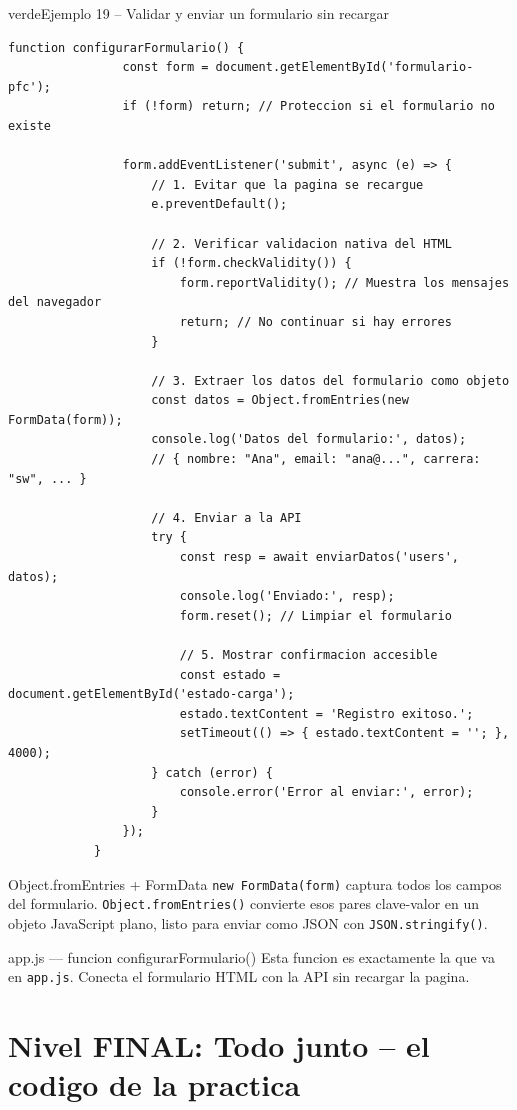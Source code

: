 \documentclass[11pt,a4paper]{article}
\begin{document}
	\begin{cajacodigo}{verde}{Ejemplo 19 -- Validar y enviar un formulario sin recargar}
		\begin{lstlisting}[style=codejs]
			function configurarFormulario() {
				const form = document.getElementById('formulario-pfc');
				if (!form) return; // Proteccion si el formulario no existe
				
				form.addEventListener('submit', async (e) => {
					// 1. Evitar que la pagina se recargue
					e.preventDefault();
					
					// 2. Verificar validacion nativa del HTML
					if (!form.checkValidity()) {
						form.reportValidity(); // Muestra los mensajes del navegador
						return; // No continuar si hay errores
					}
					
					// 3. Extraer los datos del formulario como objeto
					const datos = Object.fromEntries(new FormData(form));
					console.log('Datos del formulario:', datos);
					// { nombre: "Ana", email: "ana@...", carrera: "sw", ... }
					
					// 4. Enviar a la API
					try {
						const resp = await enviarDatos('users', datos);
						console.log('Enviado:', resp);
						form.reset(); // Limpiar el formulario
						
						// 5. Mostrar confirmacion accesible
						const estado = document.getElementById('estado-carga');
						estado.textContent = 'Registro exitoso.';
						setTimeout(() => { estado.textContent = ''; }, 4000);
					} catch (error) {
						console.error('Error al enviar:', error);
					}
				});
			}
		\end{lstlisting}
	\end{cajacodigo}
	
	\begin{cajaconcepto}{Object.fromEntries + FormData}
		\texttt{new FormData(form)} captura todos los campos del formulario. \texttt{Object.fromEntries()} convierte esos pares clave-valor en un objeto JavaScript plano, listo para enviar como JSON con \texttt{JSON.stringify()}.
	\end{cajaconcepto}
	
	\begin{cajapractica}{app.js --- funcion configurarFormulario()}
		Esta funcion es exactamente la que va en \texttt{app.js}. Conecta el formulario HTML con la API sin recargar la pagina.
	\end{cajapractica}
	
	\section{Nivel FINAL: Todo junto -- el codigo de la practica}
	
\end{document}
